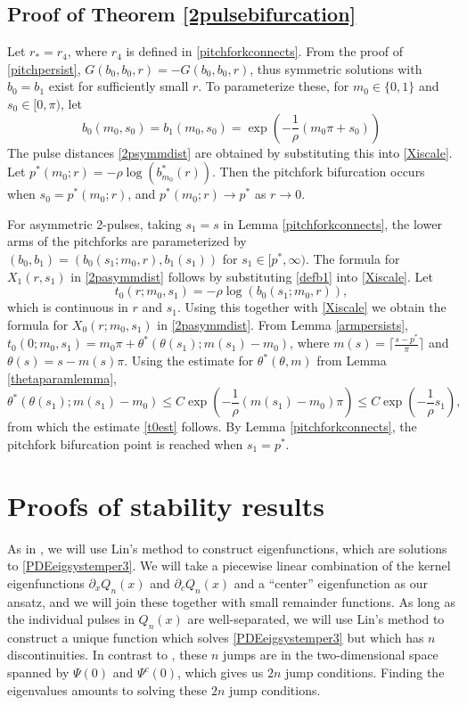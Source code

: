 \documentclass[10pt,reqno]{amsart}
\theoremstyle{plain}
\theoremstyle{definition}
\theoremstyle{remark}
\numberwithin{theorem}{section}
\numberwithin{equation}{section}
\begin{document}
\subsection{Proof of Theorem \ref{2pulsebifurcation}}

Let $r_* = r_4$, where $r_4$ is defined in \cref{pitchforkconnects}. From the proof of \cref{pitchpersist}, $G(b_0, b_0, r) = -G(b_0, b_0, r)$, thus symmetric solutions with $b_0 = b_1$ exist for sufficiently small $r$. To parameterize these, for $m_0 \in \{0, 1\}$ and $s_0 \in [0, \pi)$, let
\[
b_0(m_0, s_0) = b_1(m_0, s_0) = 
\exp\left( -\frac{1}{\rho}(m_0 \pi + s_0) \right)
\]
The pulse distances \cref{2psymmdist} are obtained by substituting this into \cref{Xiscale}. Let $p^*(m_0; r) = -\rho \log(b_{m_0}^*(r))$. Then the pitchfork bifurcation occurs when $s_0 = p^*(m_0; r)$, and $p^*(m_0; r) \rightarrow p^*$ as $r \rightarrow 0$.

For asymmetric 2-pulses, taking $s_1 = s$ in Lemma \ref{pitchforkconnects}, the lower arms of the pitchforks are parameterized by $(b_0, b_1) = (b_0(s_1; m_0, r), b_1(s_1))$ for $s_1 \in [p^*, \infty)$. The formula for $X_1(r, s_1)$ in \cref{2pasymmdist} follows by substituting \cref{defb1} into \cref{Xiscale}. Let 
\begin{equation}\label{deft0}
t_0(r; m_0, s_1) = -\rho \log\left( b_0(s_1; m_0, r) \right),
\end{equation}
which is continuous in $r$ and $s_1$. Using this together with \cref{Xiscale} we obtain the formula for $X_0(r; m_0, s_1)$ in \cref{2pasymmdist}. From Lemma \ref{armpersists}, $t_0(0; m_0, s_1) = m_0 \pi + \theta^*(\theta(s_1); m(s_1) - m_0)$, where $m(s) = \lceil \frac{s - p^*}{\pi} \rceil$ and $\theta(s) = s - m(s) \pi$. Using the estimate for $\theta^*(\theta, m)$ from Lemma \ref{thetaparamlemma},
\[
\theta^*(\theta(s_1); m(s_1) - m_0) \leq C \exp\left(-\frac{1}{\rho} ( m(s_1) - m_0 )\pi \right) \leq C \exp\left(-\frac{1}{\rho} s_1 \right),
\]
from which the estimate \cref{t0est} follows. By Lemma \ref{pitchforkconnects}, the pitchfork bifurcation point is reached when $s_1 = p^*$.

\section{Proofs of stability results}

As in \cite{Sandstede1998}, we will use Lin's method to construct eigenfunctions, which are solutions to \cref{PDEeigsystemper3}. We will take a piecewise linear combination of the kernel eigenfunctions $\partial_x Q_n(x)$ and $\partial_c Q_n(x)$ and a ``center'' eigenfunction as our ansatz, and we will join these together with small remainder functions. As long as the individual pulses in $Q_n(x)$ are well-separated, we will use Lin's method to construct a unique function which solves \cref{PDEeigsystemper3} but which has $n$ discontinuities. In contrast to \cite{Sandstede1998}, these $n$ jumps are in the two-dimensional space spanned by $\Psi(0)$ and $\Psi^c(0)$, which gives us $2n$ jump conditions. Finding the eigenvalues amounts to solving these $2n$ jump conditions. 
\end{document}
